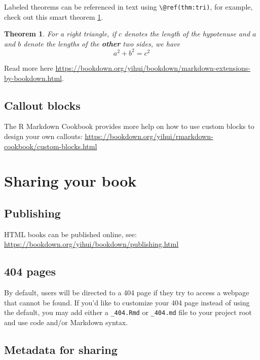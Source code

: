 \documentclass[
]{book}
\newtheorem{theorem}{Theorem}[chapter]
\theoremstyle{definition}
\theoremstyle{definition}
\theoremstyle{definition}
\theoremstyle{definition}
\theoremstyle{remark}
\begin{document}
Labeled theorems can be referenced in text using \texttt{\textbackslash{}@ref(thm:tri)}, for example, check out this smart theorem \ref{thm:tri}.

\begin{theorem}
\protect\hypertarget{thm:tri}{}\label{thm:tri}For a right triangle, if \(c\) denotes the \emph{length} of the hypotenuse
and \(a\) and \(b\) denote the lengths of the \textbf{other} two sides, we have
\[a^2 + b^2 = c^2\]
\end{theorem}

Read more here \url{https://bookdown.org/yihui/bookdown/markdown-extensions-by-bookdown.html}.

\hypertarget{callout-blocks}{%
\section{Callout blocks}\label{callout-blocks}}

The R Markdown Cookbook provides more help on how to use custom blocks to design your own callouts: \url{https://bookdown.org/yihui/rmarkdown-cookbook/custom-blocks.html}

\hypertarget{sharing-your-book}{%
\chapter{Sharing your book}\label{sharing-your-book}}

\hypertarget{publishing}{%
\section{Publishing}\label{publishing}}

HTML books can be published online, see: \url{https://bookdown.org/yihui/bookdown/publishing.html}

\hypertarget{pages}{%
\section{404 pages}\label{pages}}

By default, users will be directed to a 404 page if they try to access a webpage that cannot be found. If you'd like to customize your 404 page instead of using the default, you may add either a \texttt{\_404.Rmd} or \texttt{\_404.md} file to your project root and use code and/or Markdown syntax.

\hypertarget{metadata-for-sharing}{%
\section{Metadata for sharing}\label{metadata-for-sharing}}
\end{document}
